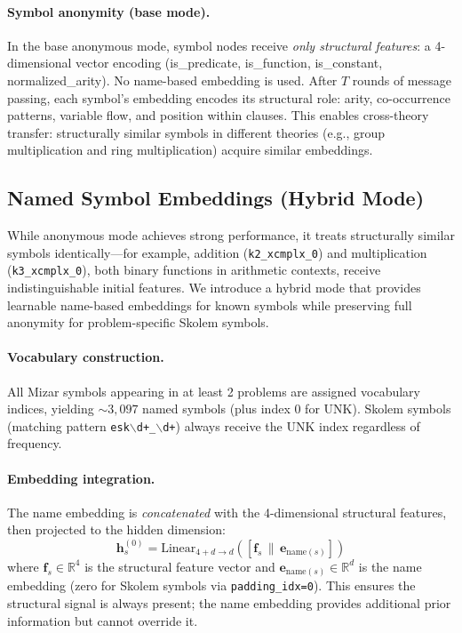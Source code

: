 \documentclass{article}
\begin{document}
\paragraph{Symbol anonymity (base mode).}
In the base anonymous mode, symbol nodes receive \emph{only structural features}: a
4-dimensional vector encoding (is\_predicate, is\_function, is\_constant,
normalized\_arity). No name-based embedding is used. After $T$ rounds of message
passing, each symbol's embedding encodes its structural role: arity, co-occurrence
patterns, variable flow, and position within clauses. This enables cross-theory
transfer: structurally similar symbols in different theories (e.g., group
multiplication and ring multiplication) acquire similar embeddings.

\subsection{Named Symbol Embeddings (Hybrid Mode)}
\label{sec:named}

While anonymous mode achieves strong performance, it treats structurally similar
symbols identically---for example, addition (\texttt{k2\_xcmplx\_0}) and
multiplication (\texttt{k3\_xcmplx\_0}), both binary functions in arithmetic
contexts, receive indistinguishable initial features. We introduce a hybrid mode
that provides learnable name-based embeddings for known symbols while preserving
full anonymity for problem-specific Skolem symbols.

\paragraph{Vocabulary construction.}
All Mizar symbols appearing in at least 2 problems are assigned vocabulary indices,
yielding ${\sim}3{,}097$ named symbols (plus index 0 for UNK). Skolem symbols
(matching pattern \texttt{esk$\backslash$d+\_$\backslash$d+}) always receive the
UNK index regardless of frequency.

\paragraph{Embedding integration.}
The name embedding is \emph{concatenated} with the 4-dimensional structural features,
then projected to the hidden dimension:
\begin{equation}
\mathbf{h}_s^{(0)} = \text{Linear}_{4+d \to d}\!\left([\mathbf{f}_s \,\|\, \mathbf{e}_{\text{name}(s)}]\right)
\end{equation}
where $\mathbf{f}_s \in \mathbb{R}^4$ is the structural feature vector and
$\mathbf{e}_{\text{name}(s)} \in \mathbb{R}^d$ is the name embedding (zero for Skolem
symbols via \texttt{padding\_idx=0}). This ensures the structural signal is always
present; the name embedding provides additional prior information but cannot override it.
\end{document}

